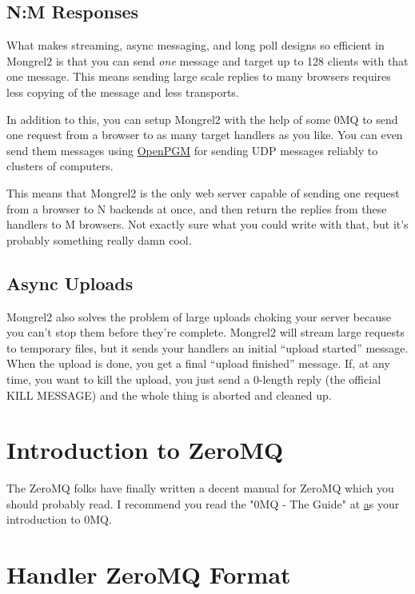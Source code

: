 \subsection{N:M Responses}

What makes streaming, async messaging, and long poll designs so efficient in Mongrel2 is that you can send
\emph{one} message and target up to 128 clients with that one message.  This means sending large scale replies
to many browsers requires less copying of the message and less transports.

In addition to this, you can setup Mongrel2 with the help of some 0MQ to send
one request from a browser to as many target handlers as you like.  You can
even send them messages using \href{http://code.google.com/p/openpgm/}{OpenPGM}
for sending UDP messages reliably to clusters of computers.

This means that Mongrel2 is the only web server capable of sending one request
from a browser to N backends at once, and then return the replies from these
handlers to M browsers.  Not exactly sure what you could write with that, but
it's probably something really damn cool.

\subsection{Async Uploads}

Mongrel2 also solves the problem of large uploads choking your server
because you can't stop them before they're complete.  Mongrel2 will stream
large requests to temporary files, but it sends your handlers an initial
``upload started'' message.  When the upload is done, you get a final ``upload 
finished'' message.  If, at any time, you want to kill the upload, you just
send a 0-length reply (the official KILL MESSAGE) and the whole thing is
aborted and cleaned up.


\section{Introduction to ZeroMQ}

The ZeroMQ folks have finally written a decent manual for ZeroMQ which you should
probably read.  I recommend you read the "0MQ - The Guide" at \href{http://zguide.zeromq.org/page:all}
as your introduction to 0MQ.

\section{Handler ZeroMQ Format}

